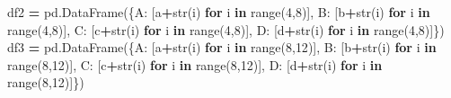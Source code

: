 \documentclass[
  letterpaper,
]{scrbook}
\newenvironment{Shaded}{\begin{snugshade}}{\end{snugshade}}
\newcommand{\BuiltInTok}[1]{#1}
\newcommand{\ControlFlowTok}[1]{\textcolor[rgb]{0.13,0.29,0.53}{\textbf{#1}}}
\newcommand{\DecValTok}[1]{\textcolor[rgb]{0.00,0.00,0.81}{#1}}
\newcommand{\KeywordTok}[1]{\textcolor[rgb]{0.13,0.29,0.53}{\textbf{#1}}}
\newcommand{\NormalTok}[1]{#1}
\newcommand{\OperatorTok}[1]{\textcolor[rgb]{0.81,0.36,0.00}{\textbf{#1}}}
\newcommand{\StringTok}[1]{\textcolor[rgb]{0.31,0.60,0.02}{#1}}
\begin{document}
\begin{Shaded}
\begin{Highlighting}[]
\NormalTok{df2 }\OperatorTok{=}\NormalTok{  pd.DataFrame(\{}\StringTok{\textquotesingle{}A\textquotesingle{}}\NormalTok{: [}\StringTok{\textquotesingle{}a\textquotesingle{}}\OperatorTok{+}\BuiltInTok{str}\NormalTok{(i) }\ControlFlowTok{for}\NormalTok{ i }\KeywordTok{in} \BuiltInTok{range}\NormalTok{(}\DecValTok{4}\NormalTok{,}\DecValTok{8}\NormalTok{)],}
    \StringTok{\textquotesingle{}B\textquotesingle{}}\NormalTok{: [}\StringTok{\textquotesingle{}b\textquotesingle{}}\OperatorTok{+}\BuiltInTok{str}\NormalTok{(i) }\ControlFlowTok{for}\NormalTok{ i }\KeywordTok{in} \BuiltInTok{range}\NormalTok{(}\DecValTok{4}\NormalTok{,}\DecValTok{8}\NormalTok{)],}
    \StringTok{\textquotesingle{}C\textquotesingle{}}\NormalTok{: [}\StringTok{\textquotesingle{}c\textquotesingle{}}\OperatorTok{+}\BuiltInTok{str}\NormalTok{(i) }\ControlFlowTok{for}\NormalTok{ i }\KeywordTok{in} \BuiltInTok{range}\NormalTok{(}\DecValTok{4}\NormalTok{,}\DecValTok{8}\NormalTok{)],}
    \StringTok{\textquotesingle{}D\textquotesingle{}}\NormalTok{: [}\StringTok{\textquotesingle{}d\textquotesingle{}}\OperatorTok{+}\BuiltInTok{str}\NormalTok{(i) }\ControlFlowTok{for}\NormalTok{ i }\KeywordTok{in} \BuiltInTok{range}\NormalTok{(}\DecValTok{4}\NormalTok{,}\DecValTok{8}\NormalTok{)]\})}
\NormalTok{df3 }\OperatorTok{=}\NormalTok{  pd.DataFrame(\{}\StringTok{\textquotesingle{}A\textquotesingle{}}\NormalTok{: [}\StringTok{\textquotesingle{}a\textquotesingle{}}\OperatorTok{+}\BuiltInTok{str}\NormalTok{(i) }\ControlFlowTok{for}\NormalTok{ i }\KeywordTok{in} \BuiltInTok{range}\NormalTok{(}\DecValTok{8}\NormalTok{,}\DecValTok{12}\NormalTok{)],}
    \StringTok{\textquotesingle{}B\textquotesingle{}}\NormalTok{: [}\StringTok{\textquotesingle{}b\textquotesingle{}}\OperatorTok{+}\BuiltInTok{str}\NormalTok{(i) }\ControlFlowTok{for}\NormalTok{ i }\KeywordTok{in} \BuiltInTok{range}\NormalTok{(}\DecValTok{8}\NormalTok{,}\DecValTok{12}\NormalTok{)],}
    \StringTok{\textquotesingle{}C\textquotesingle{}}\NormalTok{: [}\StringTok{\textquotesingle{}c\textquotesingle{}}\OperatorTok{+}\BuiltInTok{str}\NormalTok{(i) }\ControlFlowTok{for}\NormalTok{ i }\KeywordTok{in} \BuiltInTok{range}\NormalTok{(}\DecValTok{8}\NormalTok{,}\DecValTok{12}\NormalTok{)],}
    \StringTok{\textquotesingle{}D\textquotesingle{}}\NormalTok{: [}\StringTok{\textquotesingle{}d\textquotesingle{}}\OperatorTok{+}\BuiltInTok{str}\NormalTok{(i) }\ControlFlowTok{for}\NormalTok{ i }\KeywordTok{in} \BuiltInTok{range}\NormalTok{(}\DecValTok{8}\NormalTok{,}\DecValTok{12}\NormalTok{)]\})}
\end{Highlighting}
\end{Shaded}
\end{document}

